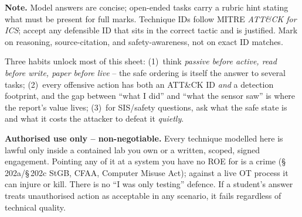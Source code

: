 \documentclass[11pt,a4paper]{article}
\begin{document}
\sheetheader

\noindent
\textbf{Note.} Model answers are concise; open-ended tasks carry a rubric hint stating what must be
present for full marks. Technique IDs follow MITRE \emph{ATT\&CK for ICS}; accept any defensible ID
that sits in the correct tactic and is justified. Mark on reasoning, source-citation, and
safety-awareness, not on exact ID matches.

\begin{hintbox}
Three habits unlock most of this sheet: (1)~think \emph{passive before active, read before write,
paper before live} -- the safe ordering is itself the answer to several tasks; (2)~every offensive
action has both an ATT\&CK ID \emph{and} a detection footprint, and the gap between ``what I did''
and ``what the sensor saw'' is where the report's value lives; (3)~for SIS/safety questions, ask
what the safe state is and what it costs the attacker to defeat it \emph{quietly}.
\end{hintbox}

\begin{warnbox}
\textbf{Authorised use only -- non-negotiable.} Every technique modelled here is lawful only inside
a contained lab you own or a written, scoped, signed engagement. Pointing any of it at a system you
have no ROE for is a crime (\S\,202a/\S\,202c StGB, CFAA, Computer Misuse Act); against a live OT
process it can injure or kill. There is no ``I was only testing'' defence. If a student's answer
treats unauthorised action as acceptable in any scenario, it fails regardless of technical quality.
\end{warnbox}
\end{document}
